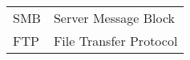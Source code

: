 
\seznamzkr

\begin{tabular}{ll}
	SMB		& Server Message Block\\	
	FTP		& File Transfer Protocol\\

\end{tabular}

